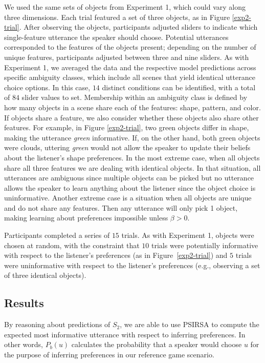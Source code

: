 \documentclass[10pt,a4paper]{article}
\begin{document}
We used the same sets of objects from Experiment 1, which could vary along three dimensions. Each trial featured a set of three objects, as in Figure \ref{exp2-trial}. After observing the objects, participants adjusted sliders to indicate which single-feature utterance the speaker should choose. Potential utterances corresponded to the features of the objects present; depending on the number of unique features, participants adjusted between three and nine sliders. As with Experiment 1, we averaged the data and the respective model predictions across specific ambiguity classes, which include all scenes that yield identical utterance choice options. 
In this case, $14$ distinct conditions can be identified, with a total of $84$ slider values to set. 
Membership within an ambiguity class is defined by how many objects in a scene share each of the features: shape, pattern, and color. If objects share a feature, we also consider whether these objects also share other features. For example, in Figure \ref{exp2-trial}, two green objects differ in shape, making the utterance \textit{green} informative. If, on the other hand, both green objects were clouds, uttering \textit{green} would not allow the speaker to update their beliefs about the listener's shape preferences.
In the most extreme case, when all objects share all three features we are dealing with identical objects. In that situation, all utterances are ambiguous since multiple objects can be picked but no utterance allows the speaker to learn anything about the listener since the object choice is uninformative. Another extreme case is a situation when all objects are unique and do not share any features. Then any utterance will only pick 1 object, making learning about preferences impossible unless $\beta>0$.

Participants completed a series of $15$ trials. As with Experiment 1, objects were chosen at random, with the constraint that $10$ trials were potentially informative with respect to the listener's preferences (as in Figure~\ref{exp2-trial}) and $5$ trials were uninformative with respect to the listener's preferences (e.g., observing a set of three identical objects).



\subsection{Results}


By reasoning about predictions of $S_2$, we are able to use PSIRSA to compute the expected most informative utterance with respect to inferring preferences. In other words, $P_b(u)$ calculates the probability that a speaker would choose $u$ for the purpose of inferring preferences in our reference game scenario.
\end{document}
